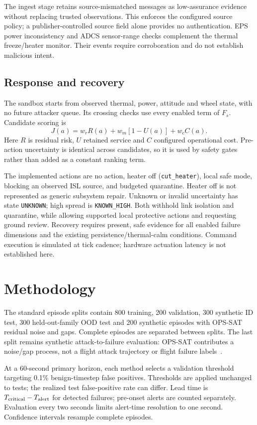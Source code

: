 \documentclass[10pt,a4paper,twocolumn]{article}
\begin{document}
The ingest stage retains source-mismatched messages as low-assurance evidence without replacing trusted observations. This enforces the configured source policy; a publisher-controlled source field alone provides no authentication. EPS power inconsistency and ADCS sensor-range checks complement the thermal freeze/heater monitor. Their events require corroboration and do not establish malicious intent.

\subsection{Response and recovery}
The sandbox starts from observed thermal, power, attitude and wheel state, with no future attacker queue. Its crossing checks use every enabled term of $F_s$. Candidate scoring is
\begin{equation}
 J(a)=w_rR(a)+w_m[1-U(a)]+w_cC(a).
\end{equation}
Here $R$ is residual risk, $U$ retained service and $C$ configured operational cost. Pre-action uncertainty is identical across candidates, so it is used by safety gates rather than added as a constant ranking term.

The implemented actions are no action, heater off (\texttt{cut\_heater}), local safe mode, blocking an observed ISL source, and budgeted quarantine. Heater off is not represented as generic subsystem repair. Unknown or invalid uncertainty has state \texttt{UNKNOWN}; high spread is \texttt{KNOWN\_HIGH}. Both withhold link isolation and quarantine, while allowing supported local protective actions and requesting ground review. Recovery requires present, safe evidence for all enabled failure dimensions and the existing persistence/thermal-calm conditions. Command execution is simulated at tick cadence; hardware actuation latency is not established here.

\section{Methodology}
The standard episode splits contain 800 training, 200 validation, 300 synthetic ID test, 300 held-out-family OOD test and 200 synthetic episodes with OPS-SAT residual noise and gaps. Complete episodes are separated between splits. The last split remains synthetic attack-to-failure evaluation: OPS-SAT contributes a noise/gap process, not a flight attack trajectory or flight failure labels~\cite{opssat}.

At a 60-second primary horizon, each method selects a validation threshold targeting 0.1\% benign-timestep false positives. Thresholds are applied unchanged to tests; the realized test false-positive rate can differ. Lead time is $T_{\rm critical}-T_{\rm alert}$ for detected failures; pre-onset alerts are counted separately. Evaluation every two seconds limits alert-time resolution to one second. Confidence intervals resample complete episodes.
\end{document}
